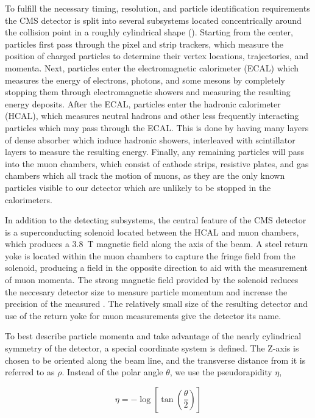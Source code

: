 To fulfill the necessary timing, resolution, and particle identification requirements the CMS detector is split into several subsystems located concentrically around the collision point in a roughly cylindrical shape (). 
Starting from the center, particles first pass through the pixel and strip trackers, which measure the position of charged particles to determine their vertex locations, trajectories, and momenta.
Next, particles enter the electromagnetic calorimeter (ECAL) which measures the energy of electrons, photons, and some mesons by completely stopping them through electromagnetic showers and measuring the resulting energy deposits.
After the ECAL, particles enter the hadronic calorimeter (HCAL), which measures neutral hadrons and other less frequently interacting particles which may pass through the ECAL. This is done by having many layers of dense absorber which induce hadronic showers, interleaved with scintillator layers to measure the resulting energy.
Finally, any remaining particles will pass into the muon chambers, which consist of cathode strips, resistive plates, and gas chambers which all track the motion of muons, as they are the only known particles visible to our detector which are unlikely to be stopped in the calorimeters.

In addition to the detecting subsystems, the central feature of the CMS detector is a superconducting solenoid located between the HCAL and muon chambers, which produces a \SI{3.8}{\tesla} magnetic field along the axis of the beam. 
A steel return yoke is located within the muon chambers to capture the fringe field from the solenoid, producing a field in the opposite direction to aid with the measurement of muon momenta.
The strong magnetic field provided by the solenoid reduces the neccesary detector size to measure particle momentum and increase the precision of the measured \pt. 
The relatively small size of the resulting detector and use of the return yoke for muon measurements give the detector its name.

To best describe particle momenta and take advantage of the nearly cylindrical symmetry of the detector, a special coordinate system is defined. 
The Z-axis is chosen to be oriented along the beam line, and the transverse distance from it is referred to as $\rho$. 
Instead of the polar angle $\theta$, we use the pseudorapidity $\eta$,

\begin{equation}
    \label{eq:pseudo}
    \eta = - \log \left[\tan\left(\frac{\theta}{2}\right)\right]
\end{equation}

